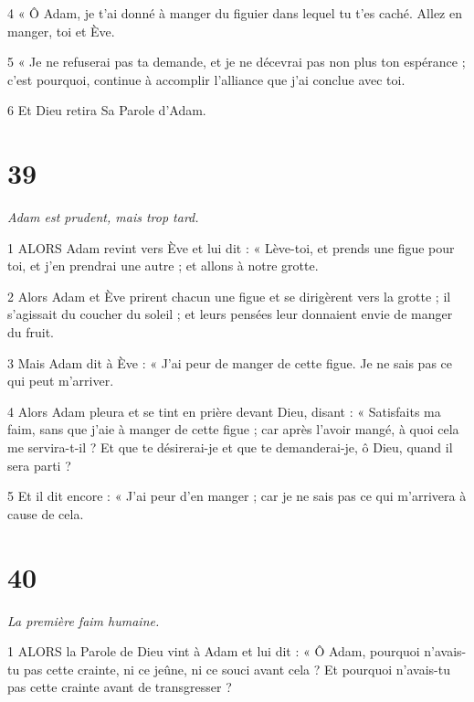 \par 4 « Ô Adam, je t'ai donné à manger du figuier dans lequel tu t'es caché. Allez en manger, toi et Ève.

\par 5 « Je ne refuserai pas ta demande, et je ne décevrai pas non plus ton espérance ; c’est pourquoi, continue à accomplir l’alliance que j’ai conclue avec toi.

\par 6 Et Dieu retira Sa Parole d'Adam.

\chapter{39}

\par \textit{Adam est prudent, mais trop tard.}

\par 1 ALORS Adam revint vers Ève et lui dit : « Lève-toi, et prends une figue pour toi, et j'en prendrai une autre ; et allons à notre grotte.

\par 2 Alors Adam et Ève prirent chacun une figue et se dirigèrent vers la grotte ; il s’agissait du coucher du soleil ; et leurs pensées leur donnaient envie de manger du fruit.

\par 3 Mais Adam dit à Ève : « J'ai peur de manger de cette figue. Je ne sais pas ce qui peut m’arriver.

\par 4 Alors Adam pleura et se tint en prière devant Dieu, disant : « Satisfaits ma faim, sans que j'aie à manger de cette figue ; car après l'avoir mangé, à quoi cela me servira-t-il ? Et que te désirerai-je et que te demanderai-je, ô Dieu, quand il sera parti ?

\par 5 Et il dit encore : « J'ai peur d'en manger ; car je ne sais pas ce qui m’arrivera à cause de cela.

\chapter{40}

\par \textit{La première faim humaine.}

\par 1 ALORS la Parole de Dieu vint à Adam et lui dit : « Ô Adam, pourquoi n'avais-tu pas cette crainte, ni ce jeûne, ni ce souci avant cela ? Et pourquoi n’avais-tu pas cette crainte avant de transgresser ?

